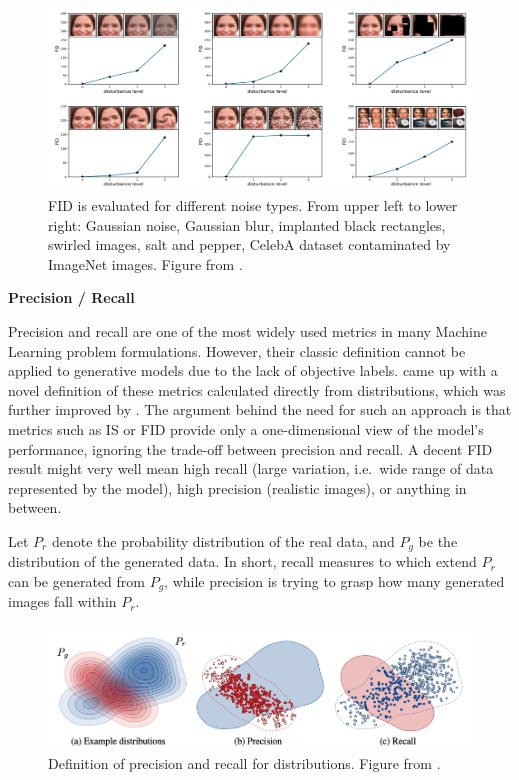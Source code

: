 \documentclass[
]{krantz}
\begin{document}
\begin{figure}

{\centering \includegraphics[width=1\linewidth]{figures/02-02-text-2-img/fiddistortions} 

}

\caption{FID is evaluated for different noise types. From upper left to lower right: Gaussian noise, Gaussian blur, implanted black rectangles, swirled images, salt and pepper, CelebA dataset contaminated by ImageNet images. Figure from \citet{FID2017}.}\label{fig:fiddistortions}
\end{figure}



\textbf{Precision / Recall}

Precision and recall are one of the most widely used metrics in many Machine Learning problem formulations. However, their classic definition cannot be applied to generative models due to the lack of objective labels. \citet{GenerativePrecisionRecall2018} came up with a novel definition of these metrics calculated directly from distributions, which was further improved by \citet{ImprovedPrecisionRecall2019}. The argument behind the need for such an approach is that metrics such as IS or FID provide only a one-dimensional view of the model's performance, ignoring the trade-off between precision and recall. A decent FID result might very well mean high recall (large variation, i.e.~wide range of data represented by the model), high precision (realistic images), or anything in between.

Let \(P_{r}\) denote the probability distribution of the real data, and \(P_{g}\) be the distribution of the generated data. In short, recall measures to which extend \(P_{r}\) can be generated from \(P_{g}\), while precision is trying to grasp how many generated images fall within \(P_{r}\).

\begin{figure}

{\centering \includegraphics[width=0.8\linewidth]{figures/02-02-text-2-img/precisionandrecall} 

}

\caption{Definition of precision and recall for distributions. Figure from \citet{ImprovedPrecisionRecall2019}.}\label{fig:precisionandrecall}
\end{figure}
\end{document}
